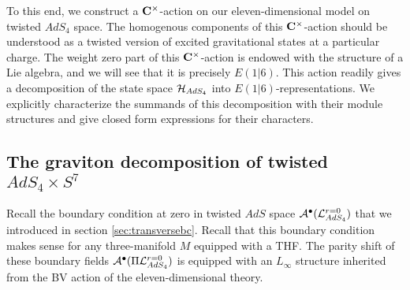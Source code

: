 \documentclass[../main.tex]{subfiles}
\begin{document}

To this end, we construct a $\mathbf{C}^\times$-action on our eleven-dimensional model on twisted $AdS_4$ space.
The homogenous components of this $\mathbf{C}^\times$-action should be understood as a twisted version of excited gravitational states at a particular charge.
The weight zero part of this $\mathbf{C}^\times$-action is endowed with the structure of a Lie algebra, and we will see that it is precisely $E(1|6)$.
This action readily gives a decomposition of the state space $\mathcal{H}_{AdS_4}$ into $E(1|6)$-representations.
We explicitly characterize the summands of this decomposition with their module structures and give closed form expressions for their characters.


\subsection{The graviton decomposition of twisted $AdS_4\times S^7$}

Recall the boundary condition at zero in twisted $AdS$ space $\mathcal A^\bullet(\mathcal L_{AdS_4}^{r=0})$ that we introduced in section \ref{sec:transversebc}.
Recall that this boundary condition makes sense for any three-manifold $M$ equipped with a THF.
The parity shift of these boundary fields $\mathcal A^\bullet(\Pi \mathcal L_{AdS_4}^{r=0})$ is equipped with an $L_\infty$ structure inherited from the BV action of the eleven-dimensional theory.

\end{document}
